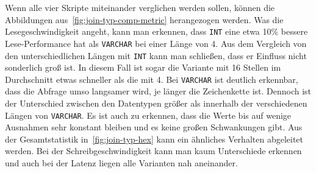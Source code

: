 Wenn alle vier Skripte miteinander verglichen werden sollen, können die Abbildungen aus~\ref{fig:join-typ-comp-metric} herangezogen werden.
Was die Lesegeschwindigkeit angeht, kann man erkennen, dass \texttt{INT} eine etwa 10\% bessere Lese-Performance hat als \texttt{VARCHAR} bei einer Länge von 4.
Aus dem Vergleich von den unterschiedlichen Längen mit \texttt{INT} kann man schließen, dass er Einfluss nicht sonderlich groß ist.
In diesem Fall ist sogar die Variante mit 16 Stellen im Durchschnitt etwas schneller als die mit 4.
Bei \texttt{VARCHAR} ist deutlich erkennbar, dass die Abfrage umso langsamer wird, je länger die Zeichenkette ist.
Dennoch ist der Unterschied zwischen den Datentypen größer als innerhalb der verschiedenen Längen von \texttt{VARCHAR}.
Es ist auch zu erkennen, dass die Werte bis auf wenige Ausnahmen sehr konstant bleiben und es keine großen Schwankungen gibt.
Aus der Gesamtstatistik in~\ref{fig:join-typ-hex} kann ein ähnliches Verhalten abgeleitet werden.
Bei der Schreibgeschwindigkeit kann man kaum Unterschiede erkennen und auch bei der Latenz liegen alle Varianten nah aneinander.

